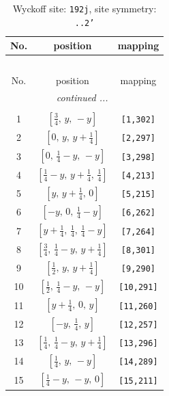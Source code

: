 \documentclass[fleqn,8pt]{jsarticle}
\begin{document}
\begin{longtable}{ccc}
\caption{Wyckoff site: {\tt 192j}, site symmetry: {\tt ..2'}}
 \\
 \hline \hline
No. & position & mapping \\ \hline \endfirsthead

\multicolumn{2}{l}{\tablename\ \thetable{}} \\
 \hline \hline
No. & position & mapping \\ \hline \endhead

 \hline \hline
\multicolumn{2}{r}{\footnotesize\it continued ...} \\ \endfoot

 \hline \hline
\multicolumn{2}{r}{} \\ \endlastfoot

1 & $\left[ \frac{3}{4},\, y,\, - y \right]$ & {\tt [1,302]} \\ \hline
2 & $\left[ 0,\, y,\, y + \frac{1}{4} \right]$ & {\tt [2,297]} \\ \hline
3 & $\left[ 0,\, \frac{1}{4} - y,\, - y \right]$ & {\tt [3,298]} \\ \hline
4 & $\left[ \frac{1}{4} - y,\, y + \frac{1}{4},\, \frac{1}{4} \right]$ & {\tt [4,213]} \\ \hline
5 & $\left[ y,\, y + \frac{1}{4},\, 0 \right]$ & {\tt [5,215]} \\ \hline
6 & $\left[ - y,\, 0,\, \frac{1}{4} - y \right]$ & {\tt [6,262]} \\ \hline
7 & $\left[ y + \frac{1}{4},\, \frac{1}{4},\, \frac{1}{4} - y \right]$ & {\tt [7,264]} \\ \hline
8 & $\left[ \frac{3}{4},\, \frac{1}{4} - y,\, y + \frac{1}{4} \right]$ & {\tt [8,301]} \\ \hline
9 & $\left[ \frac{1}{2},\, y,\, y + \frac{1}{4} \right]$ & {\tt [9,290]} \\ \hline
10 & $\left[ \frac{1}{2},\, \frac{1}{4} - y,\, - y \right]$ & {\tt [10,291]} \\ \hline
11 & $\left[ y + \frac{1}{4},\, 0,\, y \right]$ & {\tt [11,260]} \\ \hline
12 & $\left[ - y,\, \frac{1}{4},\, y \right]$ & {\tt [12,257]} \\ \hline
13 & $\left[ \frac{1}{4},\, \frac{1}{4} - y,\, y + \frac{1}{4} \right]$ & {\tt [13,296]} \\ \hline
14 & $\left[ \frac{1}{4},\, y,\, - y \right]$ & {\tt [14,289]} \\ \hline
15 & $\left[ \frac{1}{4} - y,\, - y,\, 0 \right]$ & {\tt [15,211]} \\ \hline

\end{longtable}
\end{document}
